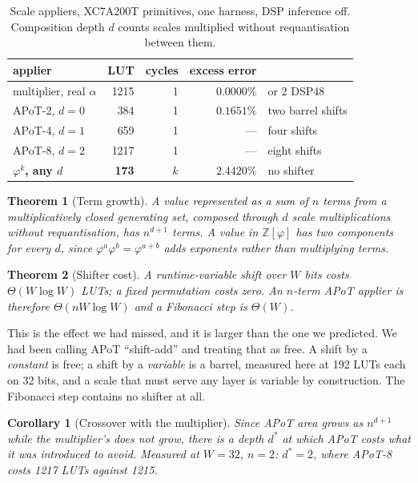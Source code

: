 \documentclass[11pt]{article}
\newtheorem{theorem}{Theorem}
\newtheorem{corollary}{Corollary}
\theoremstyle{definition}
\begin{document}
\begin{table}[t]\centering
\caption{Scale appliers, XC7A200T primitives, one harness, DSP inference off.
Composition depth $d$ counts scales multiplied without requantisation between
them.}
\label{tab:scalefrontier}
\begin{tabular}{lrrrl}
\toprule
applier & LUT & cycles & excess error & \\
\midrule
multiplier, real $\alpha$ & 1215 & 1 & $0.0000\%$ & or 2 DSP48 \\
APoT-2, $d=0$ & 384 & 1 & $0.1651\%$ & two barrel shifts \\
APoT-4, $d=1$ & 659 & 1 & --- & four shifts \\
APoT-8, $d=2$ & 1217 & 1 & --- & eight shifts \\
\textbf{$\varphi^{k}$, any $d$} & \textbf{173} & $k$ & $2.4420\%$ & no shifter \\
\bottomrule
\end{tabular}
\end{table}

\begin{theorem}[Term growth]
\label{thm:termgrowth}
A value represented as a sum of $n$ terms from a multiplicatively closed
generating set, composed through $d$ scale multiplications without
requantisation, has $n^{d+1}$ terms. A value in $\mathbb{Z}[\varphi]$ has two
components for every $d$, since $\varphi^{a}\varphi^{b} = \varphi^{a+b}$ adds
exponents rather than multiplying terms.
\end{theorem}

\begin{theorem}[Shifter cost]
\label{thm:shifter}
A runtime-variable shift over $W$ bits costs $\Theta(W\log W)$ LUTs; a fixed
permutation costs zero. An $n$-term APoT applier is therefore
$\Theta(nW\log W)$ and a Fibonacci step is $\Theta(W)$.
\end{theorem}

This is the effect we had missed, and it is larger than the one we predicted. We
had been calling APoT ``shift-add'' and treating that as free. A shift by a
\emph{constant} is free; a shift by a \emph{variable} is a barrel, measured here
at 192 LUTs each on 32 bits, and a scale that must serve any layer is variable by
construction. The Fibonacci step contains no shifter at all.

\begin{corollary}[Crossover with the multiplier]
\label{cor:crossover}
Since APoT area grows as $n^{d+1}$ while the multiplier's does not grow, there is
a depth $d^{*}$ at which APoT costs what it was introduced to avoid. Measured at
$W=32$, $n=2$: $d^{*}=2$, where APoT-8 costs 1217 LUTs against 1215.
\end{corollary}
\end{document}
